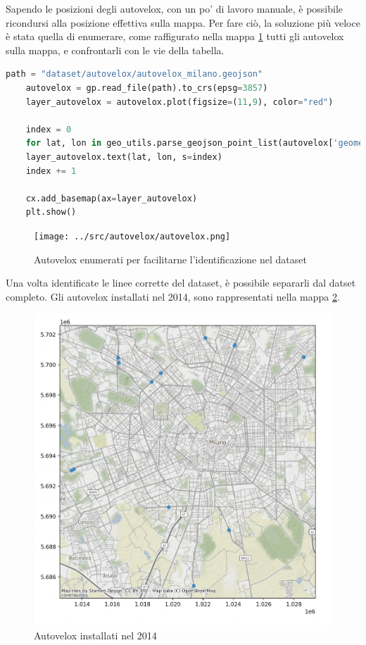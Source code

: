 \documentclass[a4paper]{report}
\begin{document}
Sapendo le posizioni degli autovelox, con un po' di lavoro manuale, è possibile ricondursi alla 
posizione effettiva sulla mappa.
Per fare ciò, la soluzione più veloce è stata quella di enumerare, 
come raffigurato nella mappa \ref{fig:autovelox-indici} tutti gli autovelox sulla mappa, 
e confrontarli con le vie della tabella.

\begin{lstlisting}[language=Python]
    path = "dataset/autovelox/autovelox_milano.geojson"
    autovelox = gp.read_file(path).to_crs(epsg=3857)
    layer_autovelox = autovelox.plot(figsize=(11,9), color="red")
    
    index = 0
    for lat, lon in geo_utils.parse_geojson_point_list(autovelox['geometry'].astype(str)):
    layer_autovelox.text(lat, lon, s=index)
    index += 1
    
    cx.add_basemap(ax=layer_autovelox)
    plt.show()
\end{lstlisting}

\begin{figure}
    \texttt{[image: ../src/autovelox/autovelox.png]}
    \caption{Autovelox enumerati per facilitarne l'identificazione nel dataset}
    \label{fig:autovelox-indici}
\end{figure}

Una volta identificate le linee corrette del dataset, è possibile separarli dal datset completo.
Gli autovelox installati nel 2014, sono rappresentati nella mappa \ref{fig:autovelox-2014}.
\begin{figure}
    \includegraphics[width=\linewidth]{../src/autovelox/autovelox_2014.png}
    \caption{Autovelox installati nel 2014}
    \label{fig:autovelox-2014}
\end{figure}
\end{document}
